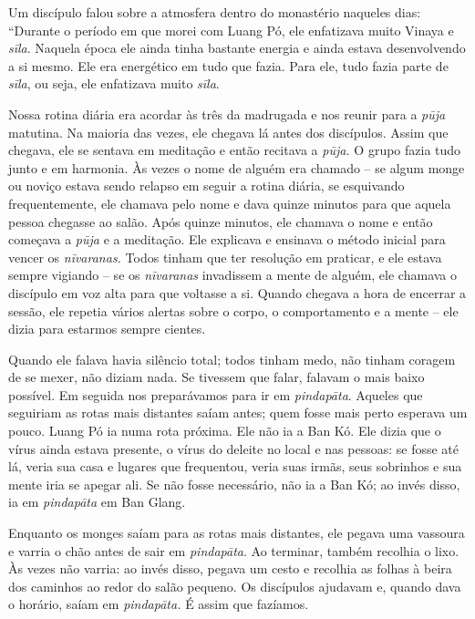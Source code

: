 Um discípulo falou sobre a atmosfera dentro do monastério naqueles dias:
``Durante o período em que morei com Luang Pó, ele enfatizava muito
Vinaya e \emph{sīla}. Naquela época ele ainda tinha bastante energia e
ainda estava desenvolvendo a si mesmo. Ele era energético em tudo que
fazia. Para ele, tudo fazia parte de \emph{sīla}, ou seja, ele
enfatizava muito \emph{sīla}.

Nossa rotina diária era acordar às três da madrugada e nos reunir para a
\emph{pūja} matutina. Na maioria das vezes, ele chegava lá antes dos
discípulos. Assim que chegava, ele se sentava em meditação e então
recitava a \emph{pūja.} O grupo fazia tudo junto e em harmonia. Às vezes
o nome de alguém era chamado -- se algum monge ou noviço estava sendo
relapso em seguir a rotina diária, se esquivando frequentemente, ele
chamava pelo nome e dava quinze minutos para que aquela pessoa chegasse
ao salão. Após quinze minutos, ele chamava o nome e então começava a
\emph{pūja} e a meditação. Ele explicava e ensinava o método inicial
para vencer os \emph{nīvaranas.} Todos tinham que ter resolução em
praticar, e ele estava sempre vigiando -- se os \emph{nīvaranas}
invadissem a mente de alguém, ele chamava o discípulo em voz alta para
que voltasse a si. Quando chegava a hora de encerrar a sessão, ele
repetia vários alertas sobre o corpo, o comportamento e a mente -- ele
dizia para estarmos sempre cientes.

Quando ele falava havia silêncio total; todos tinham medo, não tinham
coragem de se mexer, não diziam nada. Se tivessem que falar, falavam o
mais baixo possível. Em seguida nos preparávamos para ir em
\emph{pindapāta}. Aqueles que seguiriam as rotas mais distantes saíam
antes; quem fosse mais perto esperava um pouco. Luang Pó ia numa rota
próxima. Ele não ia a Ban Kó. Ele dizia que o vírus ainda estava
presente, o vírus do deleite no local e nas pessoas: se fosse até lá,
veria sua casa e lugares que frequentou, veria suas irmãs, seus
sobrinhos e sua mente iria se apegar ali. Se não fosse necessário, não
ia a Ban Kó; ao invés disso, ia em \emph{pindapāta} em Ban Glang.

Enquanto os monges saíam para as rotas mais distantes, ele pegava uma
vassoura e varria o chão antes de sair em \emph{pindapāta}. Ao terminar,
também recolhia o lixo. Às vezes não varria: ao invés disso, pegava um
cesto e recolhia as folhas à beira dos caminhos ao redor do salão
pequeno. Os discípulos ajudavam e, quando dava o horário, saíam em
\emph{pindapāta.} É assim que fazíamos.

